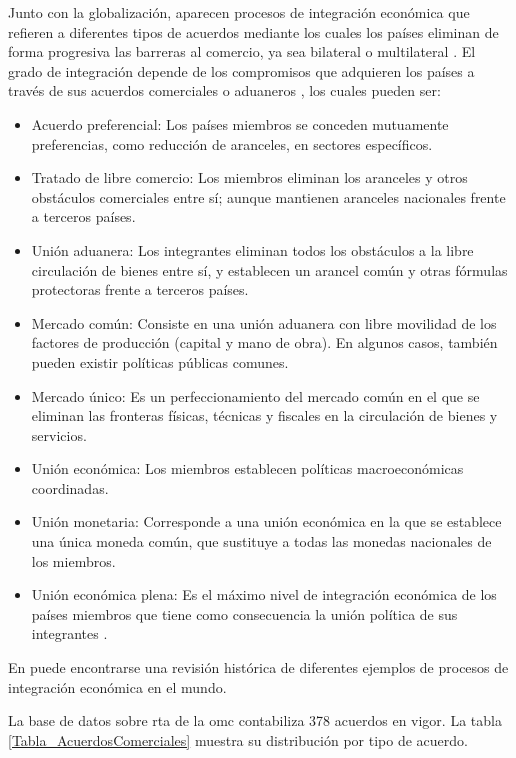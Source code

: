 Junto con la globalización, aparecen procesos de integración económica que refieren a diferentes tipos de acuerdos mediante los cuales los países eliminan de forma progresiva las barreras al comercio, ya sea bilateral o multilateral \parencite[p.~215]{Perez2012}. El grado de integración depende de los compromisos que adquieren los países a través de sus acuerdos comerciales o aduaneros \parencite[pp.~29--31]{Witker2011}, los cuales pueden ser:
\begin{itemize}
	\item Acuerdo preferencial: Los países miembros se conceden mutuamente preferencias, como reducción de aranceles, en sectores específicos.
	\item Tratado de libre comercio: Los miembros eliminan los aranceles y otros obstáculos comerciales entre sí; aunque mantienen aranceles nacionales frente a terceros países.
	\item Unión aduanera: Los integrantes eliminan todos los obstáculos a la libre circulación de bienes entre sí, y establecen un arancel común y otras fórmulas protectoras frente a terceros países.
	\item Mercado común: Consiste en una unión aduanera  con libre movilidad de los factores de producción (capital y mano de obra). En algunos casos, también pueden existir políticas públicas comunes.
	\item Mercado único: Es un perfeccionamiento del mercado común en el que se eliminan las fronteras físicas, técnicas y fiscales en la circulación de bienes y servicios.
	\item Unión económica: Los miembros establecen políticas macroeconómicas coordinadas.
	\item Unión monetaria: Corresponde a una unión económica en la que se establece una única moneda común, que sustituye a todas las monedas nacionales de los miembros.
	\item Unión económica plena: Es el máximo nivel de integración económica de los países miembros que tiene como consecuencia la unión política de sus integrantes \parencite[pp.~38--39]{Requijo2011}.
\end{itemize}
En \textcite{Tamames2012} puede encontrarse una revisión histórica de diferentes ejemplos de procesos de integración económica en el mundo.

La base de datos sobre \gls{rta} de la \gls{omc} contabiliza 378 acuerdos en vigor. La tabla \ref{Tabla_AcuerdosComerciales} muestra su distribución por tipo de acuerdo.

